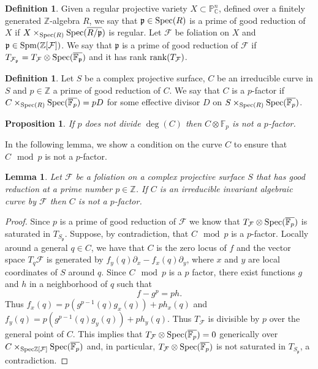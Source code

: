 \documentclass[reqno,oneside,11pt]{amsart}
\newtheorem{lemma}[thm]{Lemma}
\newtheorem{prop}[thm]{Proposition}
\theoremstyle{definition}
\newtheorem{dfn}[thm]{Definition}
\begin{document}
\begin{dfn}Given a regular projective variety $X \subset \mathbb{P}^n_\mathbb{C}$, defined over a finitely generated $\mathbb{Z}$-algebra $R$, we say that $\mathfrak{p} \in {\rm Spec}(R)$ is a prime of good reduction of $X$ if $X \times_{{\rm Spec}(R)} {\rm Spec}(\overline{R/\mathfrak{p}})$ is regular. Let $\mathcal{F}$ be foliation on $X$ and $\mathfrak{p} \in {\rm Spm}(\mathbb{Z}[\mathcal{F}])$. We say that $\mathfrak{p}$ is a prime of good reduction of $\mathcal{F}$ if $T_{\mathcal{F}_\mathfrak{p}} = T_\mathcal{F} \otimes {\rm Spec}(\overline{\mathbb{F}_\mathfrak{p}})$ and it has rank ${\rm rank}(T_\mathcal{F})$.
\end{dfn}

\begin{dfn} Let $S$ be a complex projective surface, $C$ be an irreducible curve in $S$ and $p \in \mathbb{Z}$ a prime of good reduction of $C$. We say that $C$ is a $p$-factor if $C \times_{{\rm Spec}(R)}{\rm Spec}(\overline{\mathbb{F}_p}) = pD$ for some effective divisor $D$ on $S \times_{{\rm Spec}(R)} {\rm Spec}(\overline{\mathbb{F}_p})$. 
\end{dfn}


\begin{prop} \label{prop:pdivides}
If $p$ does not divide $\deg(C)$ then $C\otimes \mathbb{F}_{p}$ is not a $p$-factor.
\end{prop}

In the following lemma, we show a condition on the curve $C$ to ensure that $C\mod p$ is not a $p$-factor.

\begin{lemma}\label{pfactor} Let $\mathcal{F}$ be a foliation on a complex projective surface $S$ that has good reduction at a prime number $p \in \mathbb{Z}$. If $C$ is an irreducible invariant algebraic curve by $\mathcal{F}$ then $C$ is not a $p$-factor.
\end{lemma}

\begin{proof} Since $p$ is a prime of good reduction of $\mathcal{F}$ we know that $T_\mathcal{F} \otimes {\rm Spec}(\overline{\mathbb{F}_p})$ is saturated in $T_{S_\mathfrak{p}}$. Suppose, by contradiction, that $C \mod p$ is a $p$-factor. Locally around a general $q \in C$, we have that $C$ is the zero locus of $f$ and the vector space $T_q\mathcal{F}$ is generated by $f_y(q) \partial_x - f_x(q) \partial_y$, where $x$ and $y$ are local coordinates of $S$ around $q$. Since $C \mod p$ is a $p$ factor, there exist functions $g$ and $h$ in a  neighborhood of $q$ such that
\[f - g^p = ph.\]
Thus $f_x(q) = p(g^{p-1}(q)g_x(q)) + ph_x(q)$ and $f_y(q) = p(g^{p-1}(q)g_y(q)) + ph_y(q)$. Thus $T_{\mathcal{F}}$ is divisible by $p$ over the general point of $C$.
This implies that $T_\mathcal{F} \otimes {\rm Spec}(\overline{\mathbb{F}_p}) = 0$ generically over $C \times_{{\rm Spec} \mathbb{Z}[\mathcal{F}]} {\rm Spec}(\overline{\mathbb{F}_p})$ and, in particular, $T_\mathcal{F} \otimes {\rm Spec}(\overline{\mathbb{F}_p})$ is not saturated in $T_{S_\mathfrak{p}}$, a contradiction.

\end{proof}
\end{document}
